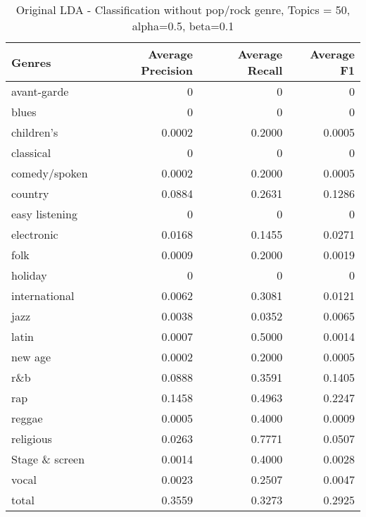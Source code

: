 \begin{table}[h]
\begin{tabular}{|l|r|r|r|}

\hline
\textbf{Genres} &  \textbf{Average Precision} & \textbf{Average Recall} & \textbf{Average F1} \\
\hline
avant-garde & 0	& 0& 	0\\
blues & 0	& 0	& 0\\
children's& 0.0002	& 0.2000	& 0.0005\\
classical& 0	& 0	& 0\\
comedy/spoken& 0.0002	& 0.2000	& 0.0005\\
country& 0.0884& 	0.2631	& 0.1286\\
easy listening& 0	& 0	& 0\\
electronic& 0.0168	& 0.1455	& 0.0271\\
folk& 0.0009	& 0.2000	& 0.0019\\
holiday& 0& 	0& 	0\\
international& 0.0062	& 0.3081& 	0.0121\\
jazz& 0.0038	& 0.0352& 	0.0065\\
latin& 0.0007	& 0.5000& 	0.0014\\
new age& 0.0002& 	0.2000	& 0.0005\\
r\&b& 0.0888	& 0.3591	& 0.1405\\
rap& 0.1458	& 0.4963	& 0.2247\\
reggae& 0.0005& 	0.4000	& 0.0009\\
religious& 0.0263	& 0.7771	& 0.0507\\
Stage \& screen& 0.0014& 	0.4000	& 0.0028\\
vocal& 0.0023	& 0.2507	& 0.0047\\
total& 0.3559	& 0.3273	& 0.2925\\
\hline
\end{tabular}
\caption{Original LDA - Classification without pop/rock genre, Topics = 50, alpha=0.5, beta=0.1}
\end{table}